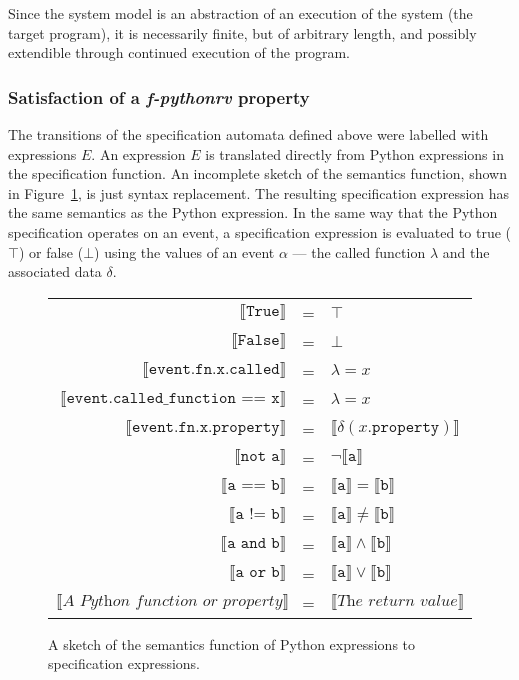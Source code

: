 Since the system model is an abstraction of an execution of the system (the
target program), it is necessarily finite, but of arbitrary length, and
possibly extendible through continued execution of the program.


\subsubsection{Satisfaction of a \textit{f-pythonrv} property}

The transitions of the specification automata defined above were labelled with
expressions $E$. An expression $E$ is translated directly from Python
expressions in the specification function. An incomplete sketch of the
semantics function, shown in Figure~\ref{figure-semantics-translation}, is
just syntax replacement. The resulting specification expression has the same
semantics as the Python expression. In the same way that the Python
specification operates on an event, a specification expression is evaluated to
true ($\top$) or false ($\bot$) using the values of an event $\alpha$ --- the
called function $\lambda$ and the associated data $\delta$.

\begin{figure}[h!]
	\begin{minipage}{0.9\textwidth}
		\centering
    \begin{tabular}{r c l}
      $\llbracket\texttt{True}\rrbracket$ & = & $\top$ \\
      $\llbracket\texttt{False}\rrbracket$ & = & $\bot$ \\
      $\llbracket\texttt{event.fn.x.called}\rrbracket$ & = & $\lambda = x$ \\
      $\llbracket\texttt{event.called\_function == x}\rrbracket$ & = & $\lambda = x$ \\
      $\llbracket\texttt{event.fn.x.property}\rrbracket$ & = & $\llbracket\delta(x.\texttt{property})\rrbracket$ \\
      $\llbracket\texttt{not a}\rrbracket$ & = & $\neg \llbracket\texttt{a}\rrbracket$ \\
      $\llbracket\texttt{a == b}\rrbracket$ & = & $\llbracket\texttt{a}\rrbracket = \llbracket\texttt{b}\rrbracket$ \\
      $\llbracket\texttt{a != b}\rrbracket$ & = & $\llbracket\texttt{a}\rrbracket \neq \llbracket\texttt{b}\rrbracket$ \\
      $\llbracket\texttt{a and b}\rrbracket$ & = & $\llbracket\texttt{a}\rrbracket \wedge \llbracket\texttt{b}\rrbracket$ \\
      $\llbracket\texttt{a or b}\rrbracket$ & = & $\llbracket\texttt{a}\rrbracket \vee \llbracket\texttt{b}\rrbracket$ \\
      $\llbracket\textit{A Python function or property}\rrbracket$ & = & $\llbracket\textit{The return value}\rrbracket$ \\
    \end{tabular}
  \end{minipage}
  \caption{A sketch of the semantics function of Python expressions to
    specification expressions.}
  \label{figure-semantics-translation}
\end{figure}


